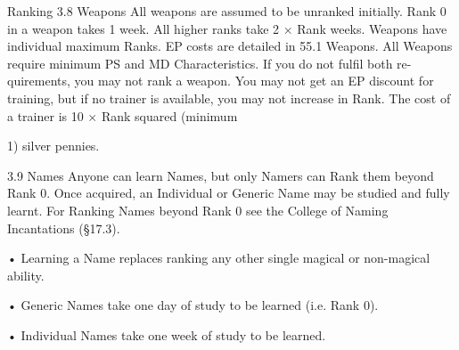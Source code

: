 \begin{Chapter}{Ranking}
3.8 Weapons 
All  weapons  are  assumed to  be  unranked initially. 
Rank 0 in a weapon takes 1 week. All higher ranks 
take  2  ×  Rank  weeks.  Weapons  have  individual 
maximum  Ranks.  EP  costs  are  detailed  in  55.1 
Weapons.  All  Weapons  require  minimum  PS  and 
MD  Characteristics.  If  you  do  not  fulfil  both  re-
quirements, you may not rank a weapon. You may 
not get an EP discount for training, but if no trainer 
is  available,  you  may  not  increase  in  Rank.  The 
cost of a trainer is 10 × Rank squared (minimum 

1) silver pennies. 

3.9 Names 
Anyone  can  learn  Names,  but  only  Namers  can 
Rank  them  beyond  Rank  0.  Once  acquired,  an 
Individual  or  Generic  Name  may  be  studied  and 
fully  learnt.  For  Ranking  Names  beyond  Rank  0 
see the College of Naming Incantations (§17.3).  

•  Learning  a  Name  replaces  ranking  any  other 
single magical or non-magical ability.  

•  Generic  Names  take  one  day  of  study  to  be 
learned (i.e. Rank 0).  

•  Individual  Names  take  one  week  of  study  to  be 
learned. 

\end{Chapter}
